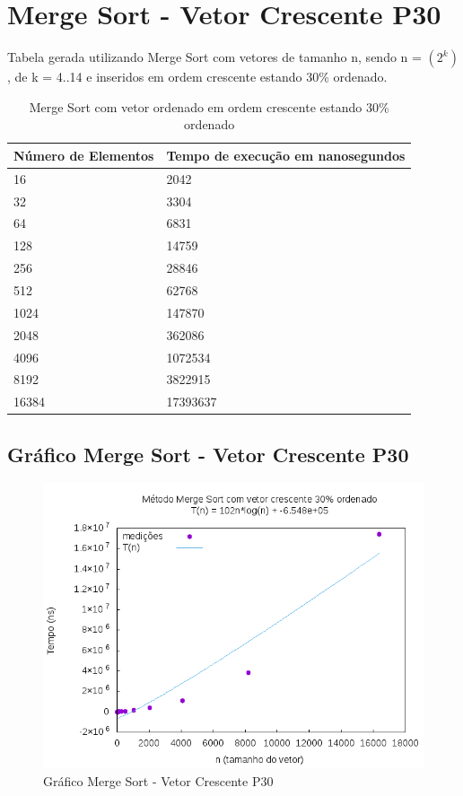 \documentclass[12pt,a4paper,twoside]{report}
\begin{document}
\section{Merge Sort - Vetor Crescente P30}
Tabela gerada utilizando Merge Sort com vetores de tamanho n, sendo n = $(2^k)$, de k = 4..14 e inseridos em ordem crescente estando 30\% ordenado.
\begin{table}[H]
\centering
\caption{Merge Sort com vetor ordenado em ordem crescente estando 30\% ordenado}
\label{my-label}
\begin{tabular}{|l|l|}
\hline
\multicolumn{1}{|c|}{\textbf{Número de Elementos}} & \multicolumn{1}{c|}{\textbf{Tempo de execução em nanosegundos}} \\ \hline
16 & 2042 \\ \hline
32 & 3304 \\ \hline
64 & 6831 \\ \hline
128 & 14759 \\ \hline
256 & 28846 \\ \hline
512 & 62768 \\ \hline
1024 & 147870 \\ \hline
2048 & 362086 \\ \hline
4096 & 1072534 \\ \hline
8192 & 3822915 \\ \hline
16384 & 17393637 \\ \hline
\end{tabular}
\end{table}

\subsection{Gráfico Merge Sort - Vetor Crescente P30}
\begin{figure}[H]
    \centering
    \includegraphics[width=0.7\linewidth]{graficos/MergeSort/vIntCrescenteP30/vIntCrescenteP30.png}
  \caption{Gráfico Merge Sort - Vetor Crescente P30}
\end{figure}
\end{document}
